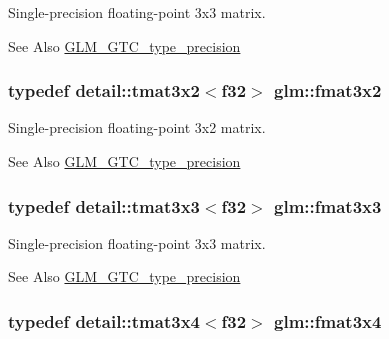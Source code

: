 Single-\/precision floating-\/point 3x3 matrix. 

\begin{DoxySeeAlso}{See Also}
\hyperlink{group__gtc__type__precision}{G\-L\-M\-\_\-\-G\-T\-C\-\_\-type\-\_\-precision} 
\end{DoxySeeAlso}
\hypertarget{group__gtc__type__precision_ga8df314d9c425c283d4cec4047b8cf1f6}{
\subsubsection[{fmat3x2}]{\setlength{\rightskip}{0pt plus 5cm}typedef detail\-::tmat3x2$<$f32$>$ {\bf glm\-::fmat3x2}}}\label{group__gtc__type__precision_ga8df314d9c425c283d4cec4047b8cf1f6}


Single-\/precision floating-\/point 3x2 matrix. 

\begin{DoxySeeAlso}{See Also}
\hyperlink{group__gtc__type__precision}{G\-L\-M\-\_\-\-G\-T\-C\-\_\-type\-\_\-precision} 
\end{DoxySeeAlso}
\hypertarget{group__gtc__type__precision_gab6848d63c51579e333fa69d335d2664a}{
\subsubsection[{fmat3x3}]{\setlength{\rightskip}{0pt plus 5cm}typedef detail\-::tmat3x3$<$f32$>$ {\bf glm\-::fmat3x3}}}\label{group__gtc__type__precision_gab6848d63c51579e333fa69d335d2664a}


Single-\/precision floating-\/point 3x3 matrix. 

\begin{DoxySeeAlso}{See Also}
\hyperlink{group__gtc__type__precision}{G\-L\-M\-\_\-\-G\-T\-C\-\_\-type\-\_\-precision} 
\end{DoxySeeAlso}
\hypertarget{group__gtc__type__precision_ga25970f79d7650ec2d422119fe1e56c3f}{
\subsubsection[{fmat3x4}]{\setlength{\rightskip}{0pt plus 5cm}typedef detail\-::tmat3x4$<$f32$>$ {\bf glm\-::fmat3x4}}}\label{group__gtc__type__precision_ga25970f79d7650ec2d422119fe1e56c3f}


